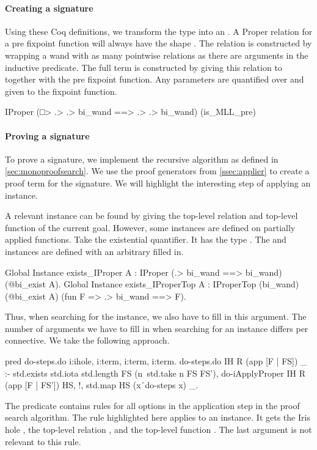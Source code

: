 \documentclass[thesis.tex]{subfiles}
\begin{document}
\paragraph{Creating a signature}
Using these Coq definitions, we transform the type into an . A Proper relation for a pre fixpoint function will always have the shape . The relation  is constructed by wrapping a wand with as many pointwise relations as there are arguments in the inductive predicate. The full  term is constructed by giving this relation to  together with the pre fixpoint function. Any parameters are quantified over and given to the fixpoint function.
\begin{coqcode}
  IProper (□> .> .> bi_wand ==> .> .> bi_wand) 
          (is_MLL_pre)
\end{coqcode}

\paragraph{Proving a signature}
To prove a signature, we implement the recursive algorithm as defined in \cref{sec:monoproofsearch}. We use the proof generators from \cref{ssec:applier} to create a proof term for the signature. We will highlight the interesting step of applying an  instance.

A relevant  instance can be found by giving the top-level relation and top-level function of the current goal. However, some  instances are defined on partially applied functions. Take the existential quantifier. It has the type . The  and  instances are defined with an arbitrary  filled in.
\begin{coqcode}
  Global Instance exists_IProper {A} : 
    IProper (.> bi_wand ==> bi_wand) 
            (@bi_exist A).
  Global Instance exists_IProperTop {A} : 
    IProperTop (bi_wand) (@bi_exist A) 
               (fun F => .> bi_wand ==> F).
\end{coqcode}
Thus, when searching for the instance, we also have to fill in this argument. The number of arguments we have to fill in when searching for an  instance differs per connective. We take the following approach.
\begin{elpicode}
  pred do-steps.do i:ihole, i:term, i:term, i:term.
  do-steps.do IH R (app [F | FS]) _ :- 
    std.exists { std.iota {std.length FS} } 
               (n\ std.take n FS FS'),
    do-iApplyProper IH R (app [F | FS']) HS, !,
    std.map HS (x\r\ do-steps x) _.
\end{elpicode}
The  predicate contains rules for all options in the application step in the proof search algorithm. The rule highlighted here applies to an  instance. It gets the Iris hole , the top-level relation , and the top-level function . The last argument is not relevant to this rule.
\end{document}
